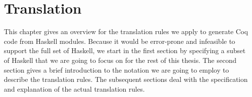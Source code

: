 \chapter{Translation} \label{chp:translation}

This chapter gives an overview for the translation rules we apply to generate Coq code from Haskell modules.
Because it would be error-prone and infeasible to support the full set of Haskell, we start in the first section by specifying a subset of Haskell that we are going to focus on for the rest of this thesis.
The second section gives a brief introduction to the notation we are going to employ to describe the translation rules.
The subsequent sections deal with the specification and explanation of the actual translation rules.







